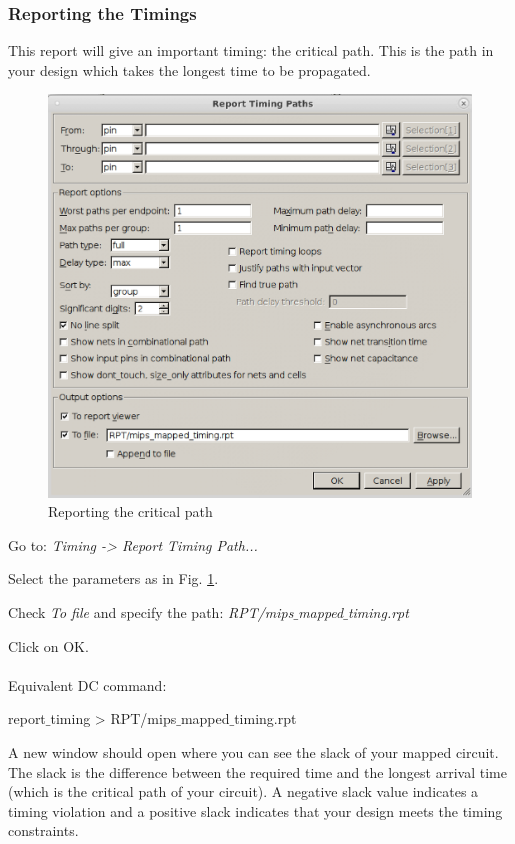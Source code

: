 \subsubsection{Reporting the Timings}

This report will give an important timing: the critical path. This is the path in your design which takes the longest time to be propagated.
 \begin{enumerate}
	\parbox[t]{\dimexpr\textwidth-\leftmargin}{%
		\begin{figure}
			\vspace{0mm}
			\centering
			\vspace{-\baselineskip}
	\includegraphics[scale=0.32]{figures/lab3_design_compiler/reportiming}
\caption{Reporting the critical path}
\label{fig_reportiming}
		\end{figure}
	\item Go to: \textit {Timing -> Report Timing Path...}
\item Select the parameters as in Fig. \ref{fig_reportiming}.
\item Check \textit{To file} and specify the path: \textit{RPT/mips$\_$mapped$\_$timing.rpt}
\item Click on OK. \\ \\
Equivalent DC command:
\begin{codeline}
	report$\_$timing > RPT/mips$\_$mapped$\_$timing.rpt
\end{codeline}
A new window should open where you can see the slack of your mapped circuit. The slack is the difference between the required time and the longest arrival time (which is the critical path of your circuit). A negative slack value indicates a timing violation and a positive slack indicates that your design meets the timing constraints.
	}
\end{enumerate}



